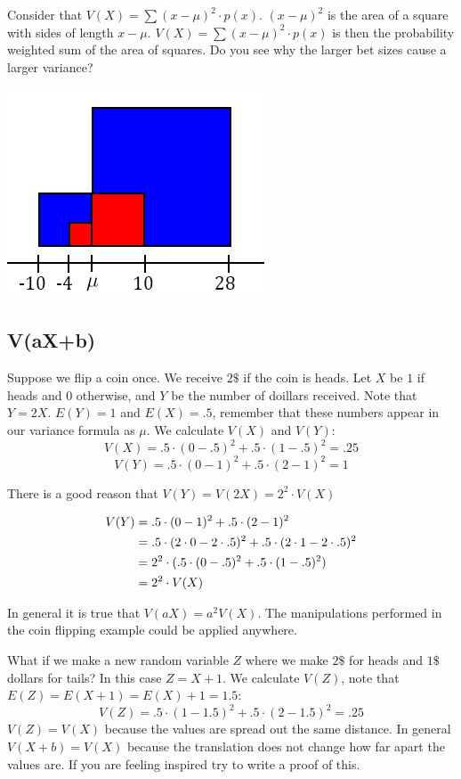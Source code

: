 \documentclass[
]{book}
\theoremstyle{definition}
\theoremstyle{definition}
\theoremstyle{definition}
\theoremstyle{remark}
\begin{document}
Consider that \(V(X)=\sum (x - \mu)^2 \cdot p(x)\). \((x - \mu)^2\) is the area of a square with sides of length \(x - \mu\). \(V(X)=\sum (x - \mu)^2 \cdot p(x)\) is then the probability weighted sum of the area of squares. Do you see why the larger bet sizes cause a larger variance?

\includegraphics{Pictures/05-Expectations/squares.PNG}

\hypertarget{vaxb}{%
\subsection{V(aX+b)}\label{vaxb}}

Suppose we flip a coin once. We receive \(2\$\) if the coin is heads. Let \(X\) be \(1\) if heads and \(0\) otherwise, and \(Y\) be the number of doillars received. Note that \(Y=2X\). \(E(Y)=1\) and \(E(X)=.5\), remember that these numbers appear in our variance formula as \(\mu\). We calculate \(V(X)\) and \(V(Y)\):
\[V(X) = .5 \cdot (0-.5)^2 + .5 \cdot (1-.5)^2=.25\]
\[V(Y) = .5 \cdot (0-1)^2 + .5 \cdot (2-1)^2=1\]

There is a good reason that \(V(Y) = V(2X)= 2^2\cdot V(X)\)

\begin{align} 
V(Y) &= .5 \cdot (0-1)^2 + .5 \cdot (2-1)^2 \notag \\
&= .5 \cdot (2 \cdot 0- 2 \cdot .5)^2 + .5 \cdot (2 \cdot 1-2 \cdot .5)^2 \notag \\
&= 2^2 \cdot (.5 \cdot (0-.5)^2 + .5 \cdot (1-.5)^2) \notag \\
&= 2^2 \cdot V(X)
\end{align}

In general it is true that \(V(aX) = a^2 V(X)\). The manipulations performed in the coin flipping example could be applied anywhere.

What if we make a new random variable \(Z\) where we make \(2\$\) for heads and \(1\$\) dollars for tails? In this case \(Z = X+1\). We calculate \(V(Z)\), note that \(E(Z)=E(X+1)=E(X)+1=1.5\):
\[V(Z) = .5 \cdot (1-1.5)^2 + .5 \cdot (2-1.5)^2=.25\]
\(V(Z)=V(X)\) because the values are spread out the same distance. In general \(V(X+b) = V(X)\) because the translation does not change how far apart the values are. If you are feeling inspired try to write a proof of this.
\end{document}
